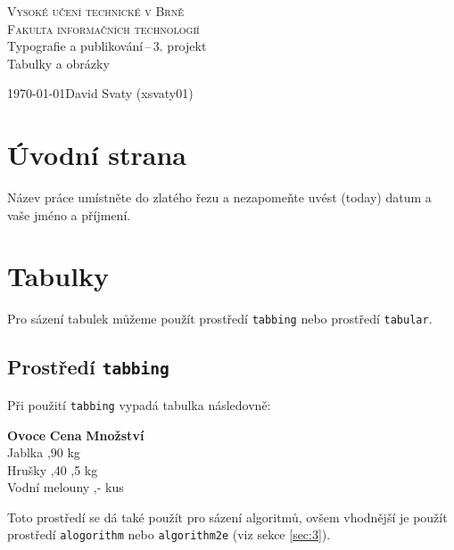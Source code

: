 \documentclass[a4paper,11pt, hidelinks]{article}
\begin{document}
\SetNlSkip{-1em}
\setlength{\unitlength}{1cm}

\begin{titlepage}
    \begin{center}
        {\Huge \textsc{Vysoké učení technické v Brně}\\}
        {\huge \textsc{Fakulta informačních technologií}\\}
        {\LARGE Typografie a publikování\,--\,3. projekt}\\[0.4em]
        {\Huge Tabulky a obrázky \\}
    \end{center}

    {\Large \today \hfill David Svaty (xsvaty01)}
\end{titlepage}

\label{page:1}

\section{Úvodní strana}
\label{sec:1}
Název práce umístněte do zlatého řezu a nezapomeňte uvést  (today) datum a vaše jméno a příjmení.

\section{Tabulky}
\label{sec:2}
Pro sázení tabulek můžeme použít prostředí \texttt{tabbing} nebo prostředí \texttt{tabular}.

\subsection{Prostředí \texttt{tabbing}}
Při použití \texttt{tabbing} vypadá tabulka následovně:
\begin{tabbing}
    \textbf{Ovoce} \hspace{16mm} \= \textbf{Cena} \hspace{4mm} \= \textbf{Množství} \\
    Jablka ,90  kg \\
    Hrušky ,40 ,5 kg \\
    Vodní melouny ,-  kus \\
\end{tabbing}
Toto prostředí se dá také použít pro sázení algoritmů, ovšem vhodnější je použít prostředí \texttt{alogorithm} nebo \texttt{algorithm2e} (viz sekce \ref*{sec:3}).
\end{document}
